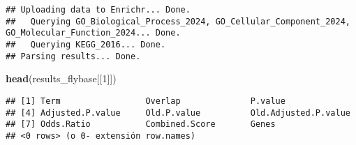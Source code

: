\documentclass[
]{article}
\newenvironment{Shaded}{\begin{snugshade}}{\end{snugshade}}
\newcommand{\DecValTok}[1]{\textcolor[rgb]{0.00,0.00,0.81}{#1}}
\newcommand{\FunctionTok}[1]{\textcolor[rgb]{0.13,0.29,0.53}{\textbf{#1}}}
\newcommand{\NormalTok}[1]{#1}
\begin{document}
\begin{verbatim}
## Uploading data to Enrichr... Done.
##   Querying GO_Biological_Process_2024, GO_Cellular_Component_2024, GO_Molecular_Function_2024... Done.
##   Querying KEGG_2016... Done.
## Parsing results... Done.
\end{verbatim}

\begin{Shaded}
\begin{Highlighting}[]
\FunctionTok{head}\NormalTok{(results\_flybase[[}\DecValTok{1}\NormalTok{]])}
\end{Highlighting}
\end{Shaded}

\begin{verbatim}
## [1] Term                 Overlap              P.value             
## [4] Adjusted.P.value     Old.P.value          Old.Adjusted.P.value
## [7] Odds.Ratio           Combined.Score       Genes               
## <0 rows> (o 0- extensión row.names)
\end{verbatim}
\end{document}

